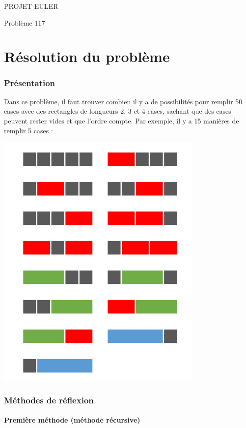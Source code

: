 \documentclass{article}
\begin{document}
\hfill
\hfill
\hfill
\begin{center}
  \large{PROJET EULER}

  Problème 117
\end{center}
\tableofcontents
\newpage
\part {Résolution du problème}
\section {Présentation}

Dans ce problème, il faut trouver combien il y a de possibilités pour remplir 50 cases avec des rectangles de longueurs 2, 3 et 4 cases, sachant que des cases peuvent rester vides et que l'ordre compte. Par exemple, il y a 15 manières de remplir 5 cases :
\bigbreak
\begin{center}
\includegraphics[scale = 0.5]{Images/presentation.png}
\end{center}
\bigbreak

\section{Méthodes de réflexion}

\subsection{Première méthode (méthode récursive)}
\end{document}

